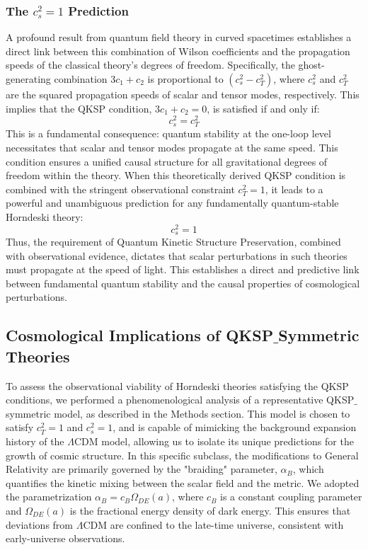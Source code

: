 \documentclass[twocolumn]{aastex631}
\begin{document}
\subsubsection{The $c_s^2=1$ Prediction}
A profound result from quantum field theory in curved spacetimes establishes a direct link between this combination of Wilson coefficients and the propagation speeds of the classical theory's degrees of freedom. Specifically, the ghost-generating combination $3c_1 + c_2$ is proportional to $(c_s^2 - c_T^2)$, where $c_s^2$ and $c_T^2$ are the squared propagation speeds of scalar and tensor modes, respectively. This implies that the QKSP condition, $3c_1 + c_2 = 0$, is satisfied if and only if:
$$c_s^2 = c_T^2$$
This is a fundamental consequence: quantum stability at the one-loop level necessitates that scalar and tensor modes propagate at the same speed. This condition ensures a unified causal structure for all gravitational degrees of freedom within the theory. When this theoretically derived QKSP condition is combined with the stringent observational constraint $c_T^2=1$, it leads to a powerful and unambiguous prediction for any fundamentally quantum-stable Horndeski theory:
$$c_s^2 = 1$$
Thus, the requirement of Quantum Kinetic Structure Preservation, combined with observational evidence, dictates that scalar perturbations in such theories must propagate at the speed of light. This establishes a direct and predictive link between fundamental quantum stability and the causal properties of cosmological perturbations.

\subsection{Cosmological Implications of QKSP\ensuremath{\_}Symmetric Theories}

To assess the observational viability of Horndeski theories satisfying the QKSP conditions, we performed a phenomenological analysis of a representative QKSP\ensuremath{\_}symmetric model, as described in the Methods section. This model is chosen to satisfy $c_T^2=1$ and $c_s^2=1$, and is capable of mimicking the background expansion history of the $\Lambda$CDM model, allowing us to isolate its unique predictions for the growth of cosmic structure. In this specific subclass, the modifications to General Relativity are primarily governed by the "braiding" parameter, $\alpha_B$, which quantifies the kinetic mixing between the scalar field and the metric. We adopted the parametrization $\alpha_B = c_B \Omega_{DE}(a)$, where $c_B$ is a constant coupling parameter and $\Omega_{DE}(a)$ is the fractional energy density of dark energy. This ensures that deviations from $\Lambda$CDM are confined to the late-time universe, consistent with early-universe observations.
\end{document}
